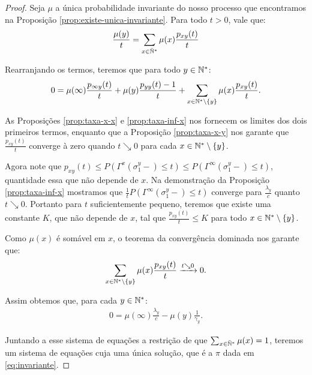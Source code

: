 \begin{proof}
  Seja $\mu$ a única probabilidade invariante do nosso processo que
  encontramos na Proposição \ref{prop:existe-unica-invariante}. Para
  todo $t > 0$, vale que:
  \begin{gather*}
    \frac{\mu(y)}{t} = \sum_{x \in {\mathbb{\bar{N}^*}}} \mu(x) \frac{p_{x y}
      (t)}{t}\\
  \end{gather*}

  Rearranjando os termos, teremos que para todo $y \in {\mathbb{N^*}}$:
  \begin{displaymath}
    0 = \mu(\infty) \frac{p_{\infty y}(t)}{t} + 
    \mu(y) \frac{p_{y y}(t) - 1}{t} + 
    \sum_{x \in {\mathbb{N^*}} \setminus \{y\}} \mu(x) \frac{p_{x
        y}(t)}{t}.
  \end{displaymath}

  As Proposições \ref{prop:taxa-x-x} e \ref{prop:taxa-inf-x} nos
  fornecem os limites dos dois primeiros termos, enquanto que a
  Proposição \ref{prop:taxa-x-y} nos garante que $\frac{p_{x
      y}(t)}{t}$ converge à zero quando $t \searrow 0$ para cada $x
  \in {\mathbb{N^*}} \setminus \{y\}$.

  Agora note que $p_{x y} (t) \leq P(\Gamma^x (\sigma_1^y -) \leq t)
  \leq P(\Gamma^\infty (\sigma_1^y -) \leq t)$, quantidade essa que
  não depende de $x$. Na demonstração da Proposição
  \ref{prop:taxa-inf-x} mostramos que $\frac{1}{t}P(\Gamma^\infty
  (\sigma_1^y -) \leq t)$ converge para $\frac{\lambda_y}{c}$ quanto
  $t \searrow 0$. Portanto para $t$ suficientemente pequeno, teremos
  que existe uma constante $K$, que não depende de $x$, tal que
  $\frac{p_{x y}(t)}{t} \leq K$ para todo $x \in {\mathbb{N^*}}\setminus \{y\}$.

  Como $\mu(x)$ é somável em $x$, o teorema da convergência dominada
  nos garante que:
  \begin{displaymath}
    \sum_{x \in {\mathbb{N^*}} \setminus \{y\}} \mu(x)
    \frac{p_{x y}(t)}{t} \xrightarrow{t \searrow 0} 0.
  \end{displaymath}

  Assim obtemos que, para cada $y \in {\mathbb{N^*}}$:
  \begin{gather*}
    0 = \mu(\infty) \frac{\lambda_y}{c} - \mu(y) \frac{1}{\gamma_y}.
  \end{gather*}

  Juntando a esse sistema de equações a restrição de que
  $\sum_{x\in{\mathbb{\bar{N}^*}}}\mu(x) = 1$, teremos um sistema de equações cuja uma única
  solução, que é a $\pi$ dada em \eqref{eq:invariante}.
\end{proof}

